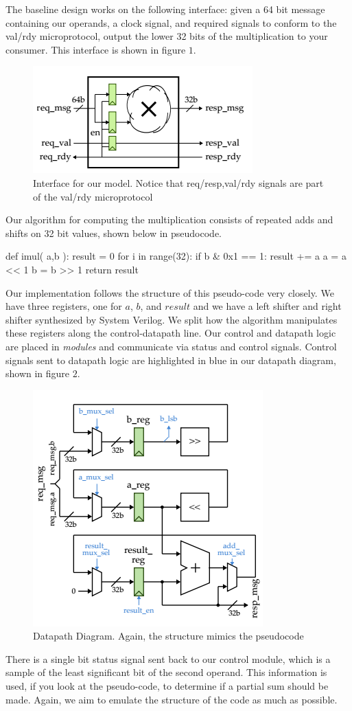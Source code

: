 \documentclass[11pt,twocolumn]{article}
\begin{document}
The baseline design works on the following interface: given a 64 bit message containing our operands, a clock signal,
and required signals to conform to the val/rdy microprotocol, output the lower 32 bits of the multiplication to your consumer.
This interface is shown in figure $1$.
\begin{figure}[b]
\centering
\includegraphics[scale=0.5]{FLmodel}
\caption{Interface for our model. Notice that req/resp,val/rdy signals are part of the val/rdy microprotocol}
\end{figure}
Our algorithm for computing the multiplication consists of repeated adds and shifts on 32 bit values, shown below in pseudocode.
\begin{python}
def imul( a,b ):
    result = 0
    for i in range(32):
        if b & 0x1 == 1:
            result += a
        a = a << 1
        b = b >> 1
    return result
\end{python}
Our implementation follows the structure of this pseudo-code very closely. We have three registers, one for $a$, $b$, and $result$ and we have 
a left shifter and right shifter synthesized by System Verilog. 
We split how the algorithm manipulates these registers along the control-datapath line. 
Our control and datapath logic are placed in \textit{modules} and communicate
via status and control signals. Control signals sent to datapath logic are highlighted in blue in our datapath diagram, shown in figure $2$. 
\begin{figure}[b]
\centering
\includegraphics[scale=0.6]{Datapath}
\caption{Datapath Diagram. Again, the structure mimics the pseudocode}
\end{figure}
There is a single bit status signal sent back to our control module, which is a sample of the least significant bit of the second operand.
This information is used, if you look at the pseudo-code, to determine if a partial sum should be made. Again, we aim to emulate the structure of the code as much as possible.   
 
\end{document}
